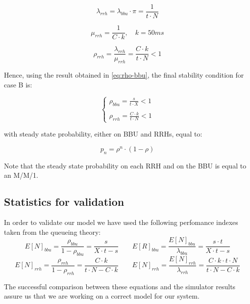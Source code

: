 \documentclass[11pt,a4paper,oneside, openright]{article}
\begin{document}
$$ \lambda_{rrh} = \lambda_{bbu} \cdot \pi = \frac{1}{t \cdot N} $$

$$ \mu_{rrh} = \frac{1}{C \cdot k}, \quad k = 50ms $$

\begin{equation} \label{eq:rho-rrh}
\rho_{rrh} = \frac{\lambda_{rrh}}{\mu_{rrh}} = \frac{C \cdot k}{t \cdot N} < 1
\end{equation}

Hence, using the result obtained in \ref{eq:rho-bbu}, the final stability condition for case B is:

$$ \begin{cases} \rho_{bbu} = \frac{s}{t \cdot X} < 1 \\ \\ \rho_{rrh} = \frac{C \cdot k}{t \cdot N} < 1 \end{cases} $$

with steady state probability, either on BBU and RRHs, equal to:

$$ p_{n} = \rho^n \cdot (1 - \rho) $$

Note that the steady state probability on each RRH and on the BBU is equal to an M/M/1.

\subsection{Statistics for validation}
In order to validate our model we have used the following perfomance indexes taken from the queueing theory:
\begin{equation}
E[N]_{bbu} = \frac{\rho_{bbu}}{1 - \rho_{bbu}} = \frac{s}{X \cdot t - s} \qquad E[R]_{bbu} = \frac{E[N]_{bbu}}{\lambda_{bbu}} =  \frac{s \cdot t}{X \cdot t - s}
\label{eq:response-time-bbu}
\end{equation}
\begin{equation}
E[N]_{rrh} = \frac{\rho_{rrh}}{1 - \rho_{rrh}} = \frac{C \cdot k}{t \cdot N - C \cdot k} \qquad E[N]_{rrh} = \frac{E[N]_{rrh}}{\lambda_{rrh}} = \frac{C \cdot k \cdot t \cdot N}{t \cdot N - C \cdot k}
\label{eq:response-time-rrh}
\end{equation}



The successful comparison between these equations and the simulator results assure us that we are working on a correct model for our system.
\end{document}
